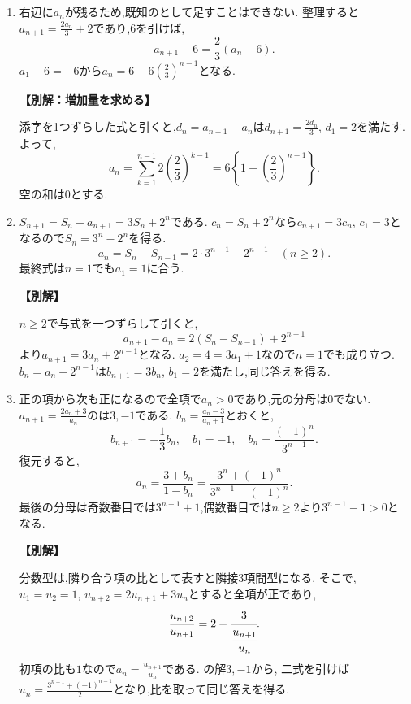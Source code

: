 \begin{enumerate}[label=\textbf{問\arabic*.},leftmargin=3.8em,format=\bookitemlink{practice-basic}{solution}{problem}]
  \item {}\BookMathLayout{}{\\}
    右辺に$a_n$が残るため,既知のとして足すことはできない.
    整理すると$a_{n+1}=\frac{2a_n}{3}+2$であり,$6$を引けば,
    \[
      a_{n+1}-6=\frac23(a_n-6).
    \]
    $a_1-6=-6$から$a_n=6-6\left(\frac{2}{3}\right)^{n-1}$となる.
    \par\smallskip\noindent\textbf{【別解：増加量を求める】}\par
    添字を1つずらした式と引くと,$d_n=a_{n+1}-a_n$は$d_{n+1}=\frac{2d_n}{3}$, $d_1=2$を満たす.
    よって,
    \[
      a_n=\sum_{k=1}^{n-1}2\left(\frac23\right)^{k-1}
      =6\left\{1-\left(\frac23\right)^{n-1}\right\}.
    \]
    空の和は$0$とする.

  \item {}\BookMathLayout{}{\\}
    $S_{n+1}=S_n+a_{n+1}=3S_n+2^n$である.
    $c_n=S_n+2^n$なら$c_{n+1}=3c_n$, $c_1=3$となるので$S_n=3^n-2^n$を得る.
    \[
      a_n=S_n-S_{n-1}=2\cdot3^{n-1}-2^{n-1}
      \quad(n\ge2).
    \]
    最終式は$n=1$でも$a_1=1$に合う.
    \par\smallskip\noindent\textbf{【別解】}\par
    $n\ge2$で与式を一つずらして引くと,
    \[
      a_{n+1}-a_n=2(S_n-S_{n-1})+2^{n-1}
    \]
    より$a_{n+1}=3a_n+2^{n-1}$となる.
    $a_2=4=3a_1+1$なので$n=1$でも成り立つ.
    $b_n=a_n+2^{n-1}$は$b_{n+1}=3b_n$, $b_1=2$を満たし,同じ答えを得る.

  \item {}\BookMathLayout{}{\\}
    正の項から次も正になるので全項で$a_n>0$であり,元の分母は0でない.
    $a_{n+1}=\frac{2a_n+3}{a_n}$のは$3,-1$である.
    $b_n=\frac{a_n-3}{a_n+1}$とおくと,
    \[
      b_{n+1}=-\frac13b_n,\quad b_1=-1,
      \quad b_n=\frac{(-1)^n}{3^{n-1}}.
    \]
    復元すると,
    \[
      a_n=\frac{3+b_n}{1-b_n}
      =\frac{3^n+(-1)^n}{3^{n-1}-(-1)^n}.
    \]
    最後の分母は奇数番目では$3^{n-1}+1$,偶数番目では$n\ge2$より$3^{n-1}-1>0$となる.
    \par\smallskip\noindent\textbf{【別解】}\par
    分数型は,隣り合う項の比として表すと隣接3項間型になる.
    そこで,$u_1=u_2=1$, $u_{n+2}=2u_{n+1}+3u_n$とすると全項が正であり,
    \[
      \frac{u_{n+2}}{u_{n+1}}=2+\cfrac3{\cfrac{u_{n+1}}{u_n}}.
    \]
    初項の比も$1$なので$a_n=\frac{u_{n+1}}{u_n}$である.
    の解$3,-1$から,
    \BookMathLayout{\[
        u_{n+1}+u_n=2\cdot3^{n-1},
        \quad u_{n+1}-3u_n=-2(-1)^{n-1}.
      \]}{\[
        \begin{aligned}
          u_{n+1}+u_n&=2\cdot3^{n-1},\\
          u_{n+1}-3u_n&=-2(-1)^{n-1}.
        \end{aligned}
      \]}
    二式を引けば$u_n=\frac{3^{n-1}+(-1)^{n-1}}{2}$となり,比を取って同じ答えを得る.


\end{enumerate}
